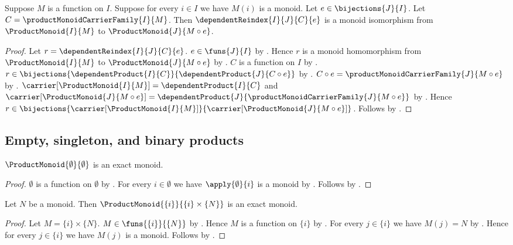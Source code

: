\begin{theorem}\label{bijective_product_monoid_reindex_isomorphism}
    Suppose $M$ is a function on $I$.
    Suppose for every $i\in I$ we have $M(i)$ is a monoid.
    Let $e\in\bijections{J}{I}$.
    Let $C=\productMonoidCarrierFamily{I}{M}$.
    Then $\dependentReindex{I}{J}{C}{e}$ is a monoid isomorphism from
        $\ProductMonoid{I}{M}$ to $\ProductMonoid{J}{M\circ e}$.
\end{theorem}
\begin{proof}
    Let $r=\dependentReindex{I}{J}{C}{e}$.
    $e\in\funs{J}{I}$ by .
    Hence $r$ is a monoid homomorphism from $\ProductMonoid{I}{M}$ to
        $\ProductMonoid{J}{M\circ e}$ by
        .
    $C$ is a function on $I$ by
        .
    $r\in\bijections{\dependentProduct{I}{C}}{
        \dependentProduct{J}{C\circ e}}$ by
        .
    $C\circ e=\productMonoidCarrierFamily{J}{M\circ e}$ by
        .
    $\carrier[\ProductMonoid{I}{M}]=\dependentProduct{I}{C}$ and
        $\carrier[\ProductMonoid{J}{M\circ e}]
            =\dependentProduct{J}{
                \productMonoidCarrierFamily{J}{M\circ e}}$ by
        .
    Hence $r\in\bijections{\carrier[\ProductMonoid{I}{M}]}{
        \carrier[\ProductMonoid{J}{M\circ e}]}$.
    Follows by .
\end{proof}

\subsection{Empty, singleton, and binary products}

\begin{proposition}\label{empty_product_monoid_is_exact}
    $\ProductMonoid{\emptyset}{\emptyset}$ is an exact monoid.
\end{proposition}
\begin{proof}
    $\emptyset$ is a function on $\emptyset$ by
        .
    For every $i\in\emptyset$ we have $\apply{\emptyset}{i}$ is a monoid by
        .
    Follows by .
\end{proof}

\begin{proposition}\label{singleton_product_monoid_is_exact}
    Let $N$ be a monoid.
    Then $\ProductMonoid{\{i\}}{\{i\}\times\{N\}}$
        is an exact monoid.
\end{proposition}
\begin{proof}
    Let $M=\{i\}\times\{N\}$.
    $M\in\funs{\{i\}}{\{N\}}$ by .
    Hence $M$ is a function on $\{i\}$ by
        .
    For every $j\in\{i\}$ we have $M(j)=N$ by
        .
    Hence for every $j\in\{i\}$ we have $M(j)$ is a monoid.
    Follows by .
\end{proof}

